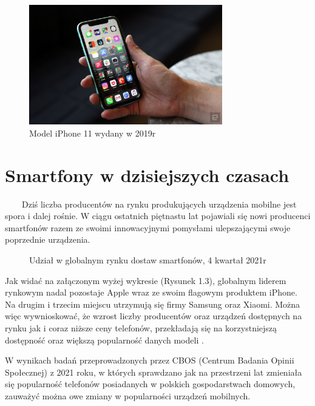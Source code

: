 \documentclass[a4paper,12pt,oneside]{book}
\begin{document}
	\begin{figure}[h]
		\centering
		\includegraphics[width=0.75\textwidth]{grafika/iphone11}
		\caption{Model iPhone 11 wydany w 2019r}
	\end{figure}
	
	\newpage
	\section{Smartfony w dzisiejszych czasach}
	\ \ \ \
	Dziś liczba producentów na rynku produkujących urządzenia mobilne jest spora i dalej rośnie. W ciągu ostatnich piętnastu lat pojawiali się nowi producenci smartfonów razem ze swoimi innowacyjnymi pomysłami ulepszającymi swoje poprzednie urządzenia. 
	
	\begin{figure}[h]
		\centering
		\caption{Udział w globalnym rynku dostaw smartfonów, 4 kwartał 2021r}
	\end{figure}
	
	Jak widać na załączonym wyżej wykresie (Rysunek 1.3), globalnym liderem rynkowym nadal pozostaje Apple wraz ze swoim flagowym produktem iPhone. Na drugim i trzecim miejscu utrzymują się firmy Samsung oraz Xiaomi. Można więc wywnioskować, że wzrost liczby producentów oraz urządzeń dostępnych na rynku jak i coraz niższe ceny telefonów, przekładają się na korzystniejszą dostępność oraz większą popularność danych modeli \cite{ref3}. 
	
	W wynikach badań przeprowadzonych przez CBOS (Centrum Badania Opinii Społecznej) z 2021 roku, w których sprawdzano jak na przestrzeni lat zmieniała się popularność telefonów posiadanych w polskich gospodarstwach domowych, zauważyć można owe zmiany w popularności urządzeń mobilnych.
	
\end{document}
